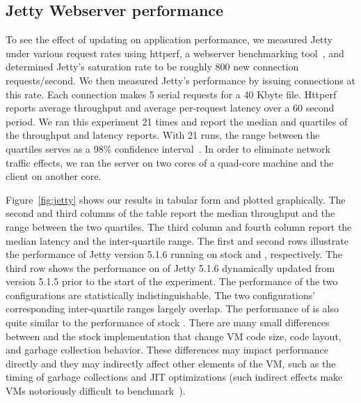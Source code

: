 % 
% 
% 



\subsection{Jetty Webserver performance}
\label{subsec:jetty-webserver-performance}

To see the effect of updating on application performance, we measured Jetty
under various request rates using httperf, a webserver
benchmarking tool~\cite{httperf}, and determined Jetty's saturation rate to
be roughly 800 new connection requests/second. We then measured Jetty's
performance by issuing connections at this rate.  Each connection makes 5
serial requests for a 40 Kbyte file. Httperf reports average throughput and
average per-request latency over a 60 second period. We ran this experiment
21 times and report the median and quartiles of the throughput and latency
reports. With 21 runs, the range between the quartiles serves as a 98\%
confidence interval~\cite{PrattGibbons81}. In order to eliminate network
traffic effects, we ran the server on two cores of a quad-core machine and
the client on another core.

Figure~\ref{fig:jetty} shows our results in tabular form and plotted
graphically.  The second and third columns of the table report the median
throughput and the range between the two quartiles.  The third column and
fourth column report the median latency and the inter-quartile range.  The
first and second rows illustrate the performance of Jetty version 5.1.6
running on stock \RVM and \JV, respectively. The third row shows the
performance on \JV of Jetty 5.1.6 dynamically updated from version 5.1.5
prior to the start of the experiment.  The performance of the two \JV
configurations are statistically indistinguishable.  The two configurations'
corresponding inter-quartile ranges largely overlap.  The performance of
\JV is also quite similar to the performance of stock \RVM.  There are many
small differences between \JV and the stock implementation that change VM
code size, code layout, and garbage collection behavior. These differences
may impact performance directly and they may indirectly affect other
elements of the VM, such as the timing of garbage collections and JIT
optimizations (such indirect effects make VMs notoriously difficult to
benchmark~\cite{dacapo-cacm, diwan-measurement}).
